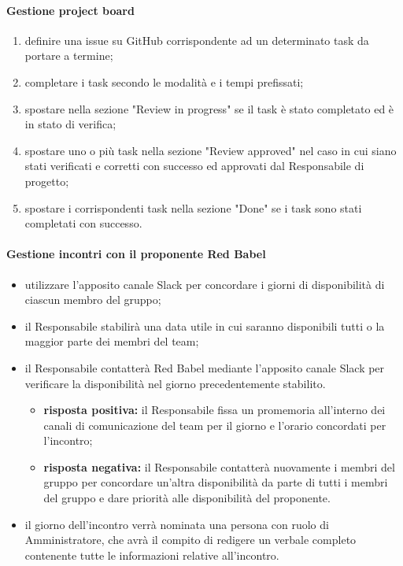  	\paragraph{Gestione project board}
	\begin{enumerate}
		\item definire una issue su GitHub corrispondente ad un determinato task da portare a termine;
		\item completare i task secondo le modalità e i tempi prefissati;
		\item spostare nella sezione "Review in progress" se il task è stato completato ed è in stato di verifica;
		\item spostare uno o più task nella sezione "Review approved" nel caso in cui siano stati verificati e corretti con successo ed approvati dal Responsabile di progetto;
		\item spostare i corrispondenti task nella sezione "Done" se i task sono stati completati con successo.
	\end{enumerate}

	\paragraph{Gestione incontri con il proponente Red Babel}
	\begin{itemize}
		\item utilizzare l'apposito canale Slack per concordare i giorni di disponibilità di ciascun membro del gruppo;
		\item il Responsabile stabilirà una data utile in cui saranno disponibili tutti o la maggior parte dei membri del team;
		\item il Responsabile contatterà Red Babel mediante l'apposito canale Slack per verificare la disponibilità nel giorno precedentemente stabilito.
		\begin{itemize}
			\item \textbf{risposta positiva:} il Responsabile fissa un promemoria all'interno dei canali di comunicazione del team per il giorno e l'orario concordati per l'incontro;
			\item \textbf{risposta negativa:} il Responsabile contatterà nuovamente i membri del gruppo per concordare un'altra disponibilità da parte di tutti i membri del gruppo e dare priorità alle disponibilità del proponente.
		\end{itemize}
		\item il giorno dell'incontro verrà nominata una persona con ruolo di Amministratore, che avrà il compito di redigere un verbale completo contenente tutte le informazioni relative all'incontro.
	\end{itemize}

